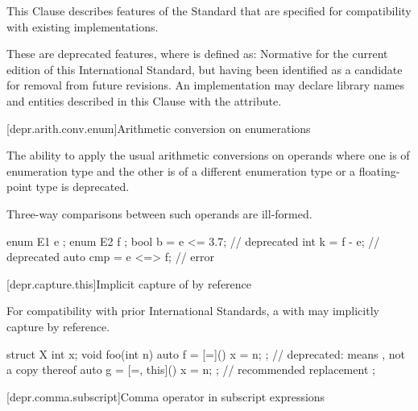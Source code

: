 
\newcommand{\requires}{\Fundesc{Requires}}

\pnum
This Clause describes features of the \Cpp{} Standard that are specified for compatibility with
existing implementations.

\pnum
These are deprecated features, where
is defined as:
Normative for the current edition of this International Standard,
but having been identified as a candidate for removal from future revisions.
An implementation may declare library names and entities described in this Clause with the
 attribute.

[depr.arith.conv.enum]{Arithmetic conversion on enumerations}

\pnum
The ability to apply the usual arithmetic conversions
on operands where one is of enumeration type
and the other is of a different enumeration type
or a floating-point type
is deprecated.
\begin{note}
Three-way comparisons between such operands are ill-formed.
\end{note}
\begin{example}
\begin{codeblock}
enum E1 { e };
enum E2 { f };
bool b = e <= 3.7;              // deprecated
int k = f - e;                  // deprecated
auto cmp = e <=> f;             // error
\end{codeblock}
\end{example}

[depr.capture.this]{Implicit capture of  by reference}

\pnum
For compatibility with prior \Cpp{} International Standards,
a  with 
\tcode{=} may implicitly capture
 by reference.
\begin{example}
\begin{codeblock}
struct X {
  int x;
  void foo(int n) {
    auto f = [=]() { x = n; };          // deprecated:  means , not a copy thereof
    auto g = [=, this]() { x = n; };    // recommended replacement
  }
};
\end{codeblock}
\end{example}

[depr.comma.subscript]{Comma operator in subscript expressions}

